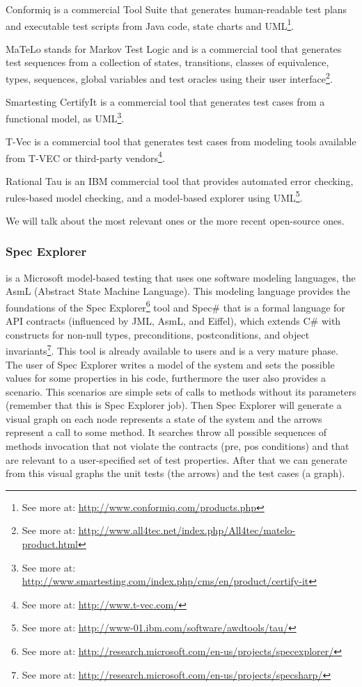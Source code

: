 \documentclass[10pt, conference, compsocconf]{IEEEtran}
\begin{document}
\begin{basedescript}{\desclabelstyle{\pushlabel}}
\item[Conformiq] is a commercial Tool Suite that generates
human-readable test plans and executable test scripts from Java code, state charts and UML\footnote{See more at: \url{http://www.conformiq.com/products.php}}.
\item[MaTeLo] stands for Markov Test Logic and is a commercial tool
that generates test sequences from a collection of states, transitions, classes of equivalence, types, sequences, global variables and test oracles
using their user interface\footnote{See more at: \url{http://www.all4tec.net/index.php/All4tec/matelo-product.html}}.
\item[Smartesting CertifyIt] is a commercial tool that generates test cases from a functional model, as UML\footnote{See more at: \url{http://www.smartesting.com/index.php/cms/en/product/certify-it}}.
\item[T-Vec] is a commercial tool that generates test cases from modeling tools available from T-VEC or third-party vendors\footnote{See more at: \url{http://www.t-vec.com/}}.
\item[Rational Tau] is an IBM commercial tool that provides automated error checking, rules-based model checking, and a model-based explorer using
UML\footnote{See more at: \url{http://www-01.ibm.com/software/awdtools/tau/}}.
\end{basedescript}
We will talk about the most relevant ones or the more recent open-source ones.

\subsubsection{\textbf{Spec Explorer}} is a Microsoft model-based testing that uses one software modeling languages, the AsmL (Abstract State Machine Language).
This modeling language provides the foundations of the Spec Explorer\footnote{See more at: \url{http://research.microsoft.com/en-us/projects/specexplorer/}} tool
and Spec\# that is a formal language for API contracts (influenced by JML, AsmL, and Eiffel), which extends C\# with constructs for non-null types,
preconditions, postconditions, and object invariants\footnote{See more at: \url{http://research.microsoft.com/en-us/projects/specsharp/}}.
This tool is already available to users and is a very mature phase.\\
\indent The user of Spec Explorer writes a model of the system and sets the possible values for some properties in his code, furthermore the user also provides a scenario.
This scenarios are simple sets of calls to methods without its parameters (remember that this is Spec Explorer job).
Then Spec Explorer will generate a visual graph on each node represents a state of the system and the arrows represent a call to some method.
It searches throw all possible sequences of methods invocation that not violate the contracts (pre, pos conditions) and
that are relevant to a user-specified set of test properties. After that we can generate from this visual graphs the unit tests (the arrows) and the
test cases (a graph).
\end{document}
